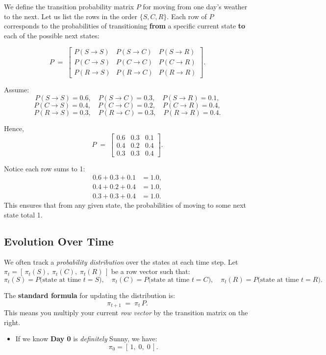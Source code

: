\begin{appendices}
We define the transition probability matrix \(P\) for moving from one day's weather to the next. 
Let us list the rows in the order \(\{S, C, R\}\). 
Each row of \(P\) corresponds to the probabilities of transitioning \textbf{from} a specific current state \textbf{to} each of the possible next states:

\[
P 
\;=\;
\begin{bmatrix}
P(S \to S) & P(S \to C) & P(S \to R) \\
P(C \to S) & P(C \to C) & P(C \to R) \\
P(R \to S) & P(R \to C) & P(R \to R)
\end{bmatrix}.
\]

Assume:
\[
P(S \to S) = 0.6, \quad 
P(S \to C) = 0.3, \quad 
P(S \to R) = 0.1,
\]
\[
P(C \to S) = 0.4, \quad 
P(C \to C) = 0.2, \quad 
P(C \to R) = 0.4,
\]
\[
P(R \to S) = 0.3, \quad 
P(R \to C) = 0.3, \quad 
P(R \to R) = 0.4.
\]

Hence,
\[
P 
\;=\;
\begin{bmatrix}
0.6 & 0.3 & 0.1 \\[6pt]
0.4 & 0.2 & 0.4 \\[6pt]
0.3 & 0.3 & 0.4
\end{bmatrix}.
\]

Notice each row sums to 1:
\begin{align*}
  0.6 + 0.3 + 0.1 &= 1.0, \\
  0.4 + 0.2 + 0.4 &= 1.0, \\
  0.3 + 0.3 + 0.4 &= 1.0.
\end{align*}
This ensures that from any given state, the probabilities of moving to some next state total 1.

\subsection{Evolution Over Time}

We often track a \textit{probability distribution} over the states at each time step. 
Let \(\pi_t = [\, \pi_t(S),\; \pi_t(C),\; \pi_t(R) \,]\) be a row vector such that:
\[
\pi_t(S) = P\bigl(\text{state at time }t = S\bigr), \quad
\pi_t(C) = P\bigl(\text{state at time }t = C\bigr), \quad
\pi_t(R) = P\bigl(\text{state at time }t = R\bigr).
\]

The \textbf{standard formula} for updating the distribution is:
\[
\pi_{t+1} 
\;=\; 
\pi_t \, P.
\]
This means you multiply your current \textit{row vector} by the transition matrix on the right.

\begin{itemize}
  \item If we know \textbf{Day 0} is \textit{definitely} Sunny, we have:
  \[
    \pi_0 = [\, 1,\; 0,\; 0 \,].
  \]


\end{itemize}
\end{appendices}
